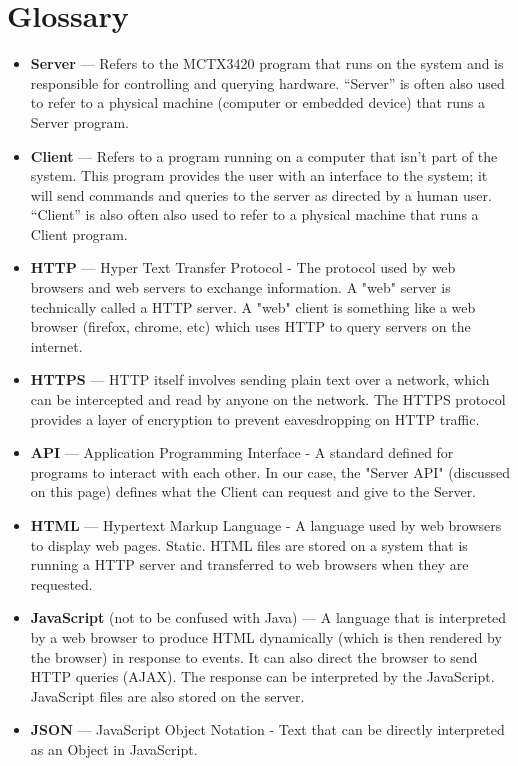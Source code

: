 \section*{Glossary}

\begin{itemize}
	\item {\bf Server} --- Refers to the MCTX3420 program that runs on the system and is responsible for controlling and querying hardware. ``Server'' is often also used to refer to a physical machine (computer or embedded device) that runs a Server program.
	\item {\bf Client} ---  Refers to a program running on a computer that isn't part of the system. This program provides the user with an interface to the system; it will send commands and queries to the server as directed by a human user. ``Client'' is also often also used to refer to a physical machine that runs a Client program.
	\item {\bf HTTP} --- Hyper Text Transfer Protocol - The protocol used by web browsers and web servers to exchange information. A "web" server is technically called a HTTP server. A "web" client is something like a web browser (firefox, chrome, etc) which uses HTTP to query servers on the internet.
	\item {\bf HTTPS} --- HTTP itself involves sending plain text over a network, which can be intercepted and read by anyone on the network. The HTTPS protocol provides a layer of encryption to prevent eavesdropping on HTTP traffic.
	\item {\bf API} --- Application Programming Interface - A standard defined for programs to interact with each other. In our case, the "Server API" (discussed on this page) defines what the Client can request and give to the Server.
	\item {\bf HTML} --- Hypertext Markup Language - A language used by web browsers to display web pages. Static. HTML files are stored on a system that is running a HTTP server and transferred to web browsers when they are requested.
	\item {\bf JavaScript} (not to be confused with Java) --- A language that is interpreted by a web browser to produce HTML dynamically (which is then rendered by the browser) in response to events. It can also direct the browser to send HTTP queries (AJAX). The response can be interpreted by the JavaScript. JavaScript files are also stored on the server.
	\item {\bf JSON} --- JavaScript Object Notation - Text that can be directly interpreted as an Object in JavaScript.

\end{itemize}
